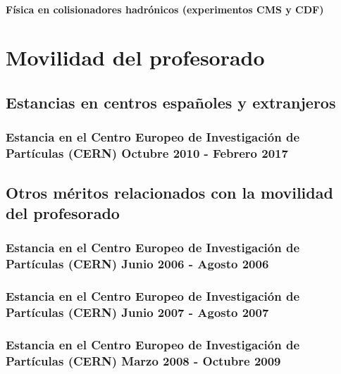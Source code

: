 \documentclass[a4paper, 11pt, twoside, openright]{report}
\begin{document}
\paragraph{Física en colisionadores hadrónicos (experimentos CMS y CDF)}




\section{Movilidad del profesorado}

\subsection{Estancias en centros españoles y extranjeros}

\subsubsection{Estancia en el Centro Europeo de Investigación de Partículas (CERN) Octubre 2010 - Febrero 2017}



\subsection{Otros méritos relacionados con la movilidad del profesorado}

\subsubsection{Estancia en el Centro Europeo de Investigación de Partículas (CERN) Junio 2006 - Agosto 2006}



\subsubsection{Estancia en el Centro Europeo de Investigación de Partículas (CERN) Junio 2007 - Agosto 2007}



\subsubsection{Estancia en el Centro Europeo de Investigación de Partículas (CERN) Marzo 2008 - Octubre 2009}

\end{document}
